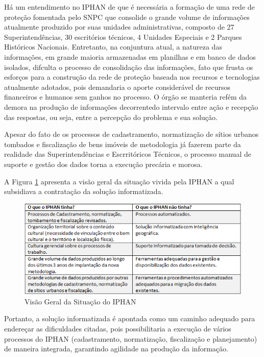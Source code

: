 Há um entendimento no IPHAN de que é necessária a formação de uma rede de proteção fomentada pelo SNPC que consolide o grande volume de informações atualmente produzido por suas unidades administrativas, composto de 27 Superintendências, 30 escritórios técnicos, 4 Unidades Especiais e 2 Parques Históricos Nacionais. Entretanto, na conjuntura atual, a natureza das informações, em grande maioria armazenadas em planilhas e em banco de dados isolados, difculta o processo de consolidação das informações, fato que frusta os esforços para a construção da rede de proteção baseada nos recursos e tecnologias atualmente adotados, pois demandaria o aporte considerável de recursos financeiros e humanos sem ganhos no processo. O órgão se manteria refém da demora na produção de informações decorrentedo intervalo entre ação e recepção das respostas, ou seja, entre a percepção do problema e sua solução.

Apesar do fato de os processos de cadastramento, normatização de sítios urbanos tombados e fiscalização de bens imóveis de metodologia já fazerem parte da realidade das Superintendências e Escrritóricos Técnicos, o processo manual de suporte e gestão dos dados torna a execução precária e morosa.

A Figura \ref{problemas}  apresenta a visão geral da situação vivida pela IPHAN a qual subsidiava a contratação da solução informatizada.

\begin{figure}[H]
		\centering
			\includegraphics[scale=1.0]{figuras/problemas.png}
		\caption{Visão Geral da Situação do IPHAN}
		\label{problemas}
\end{figure}

Portanto, a solução informatizada é apontada como um caminho adequado para endereçar as dificuldades citadas, pois possibilitaria a execução de vários processos do IPHAN (cadastramento, normatização, fiscalização e planejamento) de maneira integrada, garantindo agilidade na produção da informação. 

